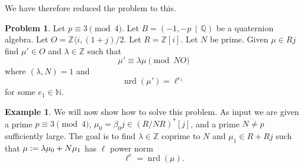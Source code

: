 \documentclass[10pt]{article}
\theoremstyle{plain}
\theoremstyle{definition}
\newtheorem{example}[theorem]{Example}
\newtheorem{problem}[theorem]{Problem}
\newcommand{\op}{\operatorname}
\newcommand{\N}{\mathbb{N}}
\newcommand{\Z}{\mathbb{Z}}
\newcommand{\Q}{\mathbb{Q}}
\newcommand{\nrd}{\op{nrd}}
\begin{document}
We have therefore reduced the problem to this.
\begin{problem}
Let \( p \equiv 3 \pmod{4} \).
Let \( B =  (-1, -p \, \mid \, \Q) \) be a quaternion algebra.
Let \( O = \Z \langle i, (1+j) / 2 \).
Let \( R = \Z[i] \).
Let \( N \) be prime.
Given \( \mu \in Rj \) find \( \mu' \in O \) and \(\lambda \in \Z \) such that
\[
    \mu' \equiv \lambda \mu \pmod{NO}
\]
where \( (\lambda, N) = 1 \) and
\[
    \nrd(\mu') = \ell^{e_1}
\]
for some \( e_1 \in \N \).
\end{problem}

\begin{example}
    We will now show how to solve this problem.
    As input we are given a prime \( p \equiv 3 \pmod{4} \), \( \mu_0 = \beta_0j \in (R / NR)^*[j] \), and a prime \( N \neq p \) sufficiently large.
    The goal is to find \( \lambda \in \Z \) coprime to \( N \) and \( \mu_1 \in  R + Rj \) such that \( \mu \vcentcolon = \lambda \mu_0 + N \mu_1 \) has \( \ell \) power norm
    \[
        \ell^e = \nrd(\mu).
    \]


\end{example}
\end{document}
